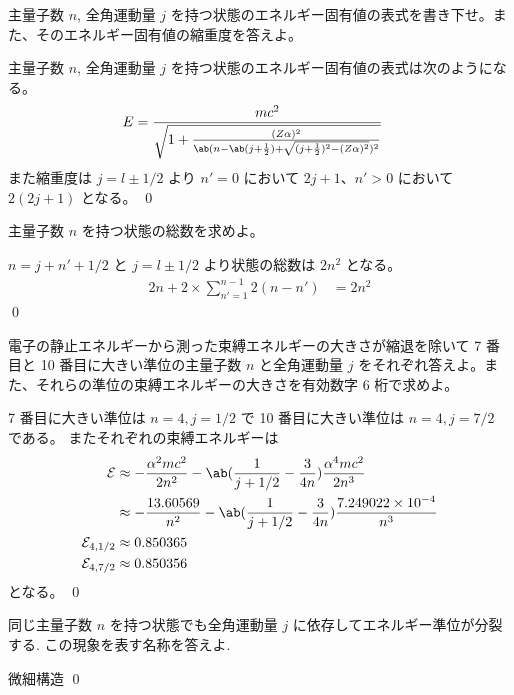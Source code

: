 \documentclass[uplatex,dvipdfmx,a4paper,11pt]{jlreq}
\makeatletter
\numberwithin{equation}{section}
\theoremstyle{definition}
\renewenvironment{proof}[1][\proofname]{\par
  \normalfont
  \topsep6\p@\@plus6\p@ \trivlist
  \item[\hskip\labelsep{\bfseries #1}\@addpunct{\bfseries}]\ignorespaces\quad\par
}{%
  \qed\endtrivlist\@endpefalse
}
\renewcommand\proofname{証明}
\makeatother
\begin{document}
\begin{problem}
主量子数 $n$, 全角運動量 $j$ を持つ状態のエネルギー固有値の表式を書き下せ。また、そのエネルギー固有値の縮重度を答えよ。
\end{problem}
\begin{proof}
  主量子数 $n$, 全角運動量 $j$ を持つ状態のエネルギー固有値の表式は次のようになる。
  \begin{align}
    E & = \frac{mc^2}{\sqrt{1 + \frac{(Z\alpha)^2}{\ab(n - \ab(j + \frac{1}{2}) + \sqrt{(j + \frac{1}{2})^2 - (Z\alpha)^2})^2}}}
  \end{align}
  また縮重度は $j = l \pm 1/2$ より $n' = 0$ において $2j + 1$、$n' > 0$ において $2(2j + 1)$ となる。
\end{proof}

\begin{problem}
主量子数 $n$ を持つ状態の総数を求めよ。
\end{problem}
\begin{proof}
  $n = j + n' + 1/2$ と $j = l \pm 1/2$ より状態の総数は $2n^2$ となる。
  \begin{align}
    2n + 2\times\sum_{n'=1}^{n-1}2(n-n') & = 2n^2
  \end{align}
\end{proof}

\begin{problem}
電子の静止エネルギーから測った束縛エネルギーの大きさが縮退を除いて 7 番目と 10 番目に大きい準位の主量子数 $n$ と全角運動量 $j$ をそれぞれ答えよ。また、それらの準位の束縛エネルギーの大きさを有効数字 6 桁で求めよ。
\end{problem}
\begin{proof}
  7 番目に大きい準位は $n = 4, j = 1/2$ で 10 番目に大きい準位は $n = 4, j = 7/2$ である。
  またそれぞれの束縛エネルギーは
  \begin{align}
    \mathcal{E}         & \approx -\frac{\alpha^2 mc^2}{2n^2} - \ab(\frac{1}{j + 1/2} - \frac{3}{4n})\frac{\alpha^4mc^2}{2n^3}   \\
                        & \approx -\frac{13.60569}{n^2} - \ab(\frac{1}{j + 1/2} - \frac{3}{4n})\frac{7.249022\times10^{-4}}{n^3} \\
    \mathcal{E}_{4,1/2} & \approx 0.850365                                                                                       \\
    \mathcal{E}_{4,7/2} & \approx 0.850356
  \end{align}
  となる。
\end{proof}

\begin{problem}
同じ主量子数 $n$ を持つ状態でも全角運動量 $j$ に依存してエネルギー準位が分裂する. この現象を表す名称を答えよ.
\end{problem}
\begin{proof}
  微細構造
\end{proof}
\end{document}
